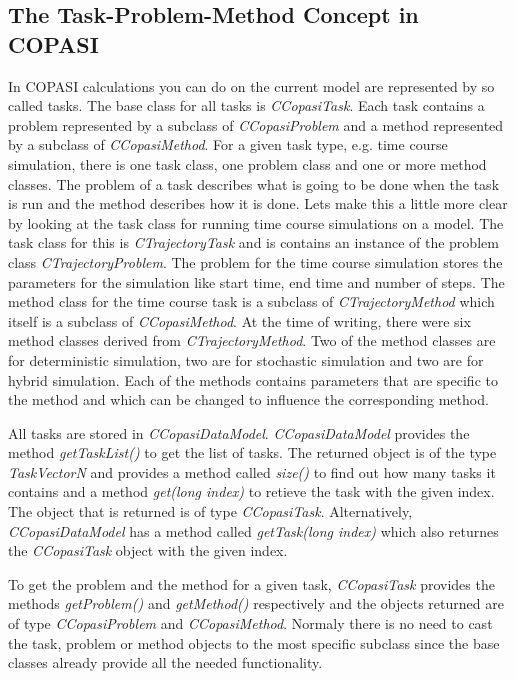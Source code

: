 \documentclass[a4,12pt]{article}
\begin{document}
\subsection{The Task-Problem-Method Concept in COPASI}
In COPASI calculations you can do on the current model are represented by so called tasks. The base class for all tasks is \textit{CCopasiTask}. Each task contains a problem represented by a subclass of \textit{CCopasiProblem} and a method represented by a subclass of \textit{CCopasiMethod}.
For a given task type, e.g. time course simulation, there is one task class, one problem class and one or more method classes. The problem of a task describes what is going to be done when the task is run and the method describes how it is done.
Lets make this a little more clear by looking at the task class for running time course simulations on a model. The task class for this is \textit{CTrajectoryTask} and is contains an instance of the problem class \textit{CTrajectoryProblem}. The problem for the time course simulation stores the parameters for the simulation like start time, end time and number of steps. The method class for the time course task is a subclass of \textit{CTrajectoryMethod} which itself is a subclass of \textit{CCopasiMethod}. At the time of writing, there were six method classes derived from \textit{CTrajectoryMethod}. Two of the method classes are for deterministic simulation, two are for stochastic simulation and two are for hybrid simulation. Each of the methods contains parameters that are specific to the method and which can be changed to influence the corresponding method.

All tasks are stored in \textit{CCopasiDataModel}. \textit{CCopasiDataModel} provides the method \textit{getTaskList()} to get the list of tasks. The returned object is of the type \textit{TaskVectorN} and provides a method called \textit{size()} to find out how many tasks it contains and a method \textit{get(long index)} to retieve the task with the given index. The object that is returned is of type \textit{CCopasiTask}. Alternatively, \textit{CCopasiDataModel} has a method called \textit{getTask(long index)} which also returnes the \textit{CCopasiTask} object with the given index.

To get the problem and the method for a given task, \textit{CCopasiTask} provides the methods \textit{getProblem()} and \textit{getMethod()} respectively and the objects returned are of type \textit{CCopasiProblem} and \textit{CCopasiMethod}. Normaly there is no need to cast the task, problem or method objects to the most specific subclass since the base classes already provide all the needed functionality.
\end{document}
